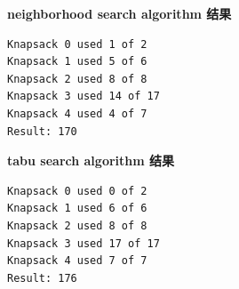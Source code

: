 \documentclass[UTF8]{ctexart}
\begin{document}
\noindent
\textbf{neighborhood search algorithm 结果}

\begin{lstlisting}[numbers=none]
Knapsack 0 used 1 of 2
Knapsack 1 used 5 of 6
Knapsack 2 used 8 of 8
Knapsack 3 used 14 of 17
Knapsack 4 used 4 of 7
Result: 170
\end{lstlisting}

\noindent
\textbf{tabu search algorithm 结果}
\begin{lstlisting}[numbers=none]
Knapsack 0 used 0 of 2
Knapsack 1 used 6 of 6
Knapsack 2 used 8 of 8
Knapsack 3 used 17 of 17
Knapsack 4 used 7 of 7
Result: 176
\end{lstlisting}
\end{document}
